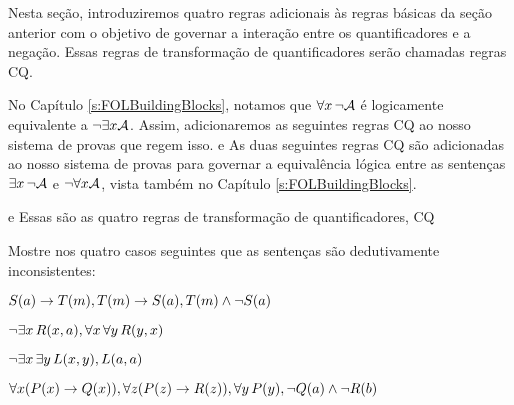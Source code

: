 Nesta se\c c\~ao, introduziremos quatro regras adicionais \`as regras b\'asicas da se\c c\~ao anterior com o objetivo de governar a intera\c c\~ao entre os quantificadores e a nega\c c\~ao. Essas regras de transforma\c c\~ao de quantificadores ser\~ao chamadas regras CQ.
 
No Capítulo  \ref{s:FOLBuildingBlocks}, notamos que $\forall x\, \neg\mathcal{A}$
   \'e logicamente equivalente a  $\neg\exists x\mathcal{A}$. Assim, adicionaremos as seguintes regras CQ ao nosso sistema de provas que regem isso. 
e
As duas seguintes  regras CQ  s\~ao adicionadas ao nosso sistema de provas para governar a equival\^encia l\'ogica entre as senten\c cas $\exists x\, \neg\mathcal{A}$  e   $\neg\forall x\mathcal{A}$, vista tamb\'em no  Capítulo  \ref{s:FOLBuildingBlocks}.

 
e
Essas s\~ao  as quatro regras de transforma\c c\~ao de quantificadores,  CQ


\practiceproblems
\problempart
 Mostre nos quatro casos seguintes que as senten\c cas s\~ao dedutivamente inconsistentes:
\begin{earg}
\item $\mathord{S}(a)\rightarrow \mathord{T}(m), \mathord{T}(m) \rightarrow \mathord{S}(a), \mathord{T}(m) \wedge \neg \mathord{S}(a)$
\item $\neg\exists x\,\mathord{R}(x,a), \forall x\, \forall y\,\mathord{R}(y,x)$
\item $\neg\exists x\, \exists y\,\mathord{L}(x,y), \mathord{L}(a,a)$
\item $\forall x(\mathord{P}(x) \rightarrow \mathord{Q}(x)), \forall z(\mathord{P}(z) \rightarrow \mathord{R}(z)), \forall y\,\mathord{P}(y), \neg \mathord{Q}(a) \wedge \neg \mathord{R}(b)$
\end{earg}

